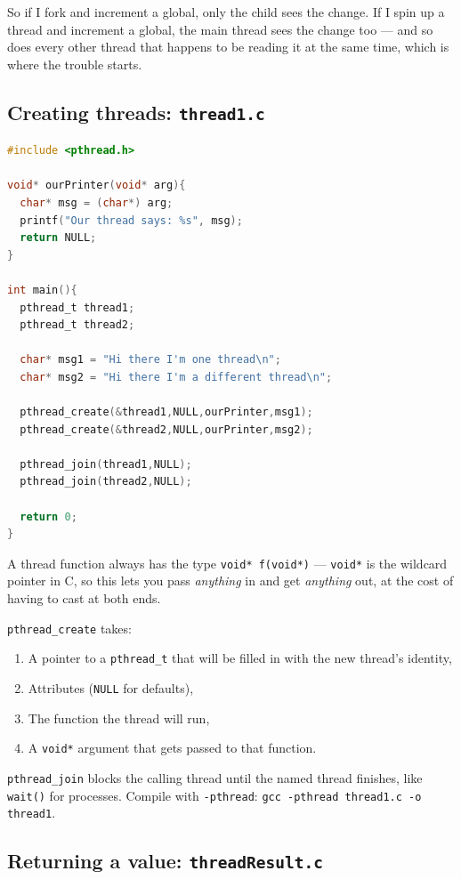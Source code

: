 \documentclass[11pt]{article}
\begin{document}
So if I fork and increment a global, only the child sees the change.
If I spin up a thread and increment a global, the main thread sees
the change too --- and so does every other thread that happens to be
reading it at the same time, which is where the trouble starts.

\subsection*{Creating threads: \texttt{thread1.c}}

\begin{lstlisting}[language=C]
#include <pthread.h>

void* ourPrinter(void* arg){
  char* msg = (char*) arg;
  printf("Our thread says: %s", msg);
  return NULL;
}

int main(){
  pthread_t thread1;
  pthread_t thread2;

  char* msg1 = "Hi there I'm one thread\n";
  char* msg2 = "Hi there I'm a different thread\n";

  pthread_create(&thread1,NULL,ourPrinter,msg1);
  pthread_create(&thread2,NULL,ourPrinter,msg2);

  pthread_join(thread1,NULL);
  pthread_join(thread2,NULL);

  return 0;
}
\end{lstlisting}

A thread function always has the type \texttt{void* f(void*)} ---
\texttt{void*} is the wildcard pointer in C, so this lets you pass
\emph{anything} in and get \emph{anything} out, at the cost of having
to cast at both ends.

\texttt{pthread\_create} takes:
\begin{enumerate}
  \item A pointer to a \texttt{pthread\_t} that will be filled in with
    the new thread's identity,
  \item Attributes (\texttt{NULL} for defaults),
  \item The function the thread will run,
  \item A \texttt{void*} argument that gets passed to that function.
\end{enumerate}

\texttt{pthread\_join} blocks the calling thread until the named
thread finishes, like \texttt{wait()} for processes. Compile with
\texttt{-pthread}: \texttt{gcc -pthread thread1.c -o thread1}.

\subsection*{Returning a value: \texttt{threadResult.c}}
\end{document}

